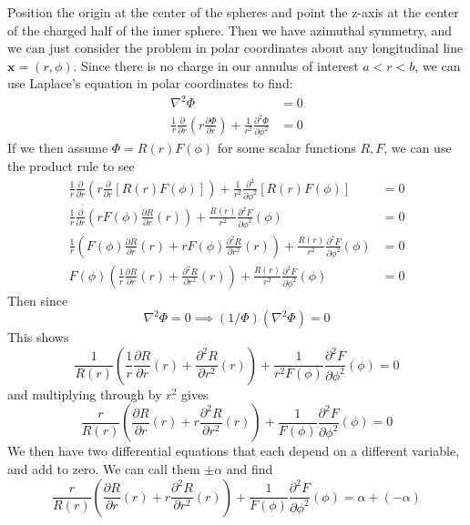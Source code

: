 \documentclass{article}
\begin{document}
\begin{solution}
Position the origin at the center of the spheres and point the z-axis at the center of the charged half of the inner sphere. Then we have azimuthal symmetry, and we can just consider the problem in polar coordinates about any longitudinal line $\mathbf{x} = (r,\phi)$. Since there is no charge in our annulus of interest $a < r < b$, we can use Laplace's equation in polar coordinates to find:
\begin{align*}
\nabla^{2} \Phi &= 0\\
\frac{1}{r} \frac{\partial}{\partial r} \left( r \frac{\partial \Phi}{\partial r} \right) + \frac{1}{r^{2}} \frac{\partial^{2} \Phi}{\partial \phi^{2}} &= 0
\end{align*}
If we then assume $\Phi=R(r)F(\phi)$ for some scalar functions $R,F$, we can use the product rule to see
\begin{align*}
\frac{1}{r} \frac{\partial}{\partial r} \left( r \frac{\partial}{\partial r} \left[ R(r)F(\phi) \right] \right) + \frac{1}{r^{2}} \frac{\partial^{2}}{\partial \phi^{2}} \left[ R(r)F(\phi) \right] &= 0\\
\frac{1}{r} \frac{\partial}{\partial r} \left( r F(\phi) \frac{\partial R}{\partial r}(r) \right) + \frac{R(r)}{r^{2}} \frac{\partial^{2} F}{\partial \phi^{2}}(\phi) &= 0\\
\frac{1}{r} \left( F(\phi) \frac{\partial R}{\partial r}(r) +  r F(\phi) \frac{\partial^{2} R}{\partial r^{2}}(r) \right) + \frac{R(r)}{r^{2}} \frac{\partial^{2} F}{\partial \phi^{2}}(\phi) &= 0\\
F(\phi) \left( \frac{1}{r} \frac{\partial R}{\partial r}(r) +  \frac{\partial^{2} R}{\partial r^{2}}(r) \right) + \frac{R(r)}{r^{2}} \frac{\partial^{2} F}{\partial \phi^{2}}(\phi) &= 0
\end{align*}
Then since 
\[ \nabla^{2}\Phi = 0 \implies (1/\Phi)(\nabla^{2}\Phi) = 0 \]
This shows
\[ \frac{1}{R(r)} \left( \frac{1}{r} \frac{\partial R}{\partial r}(r) +  \frac{\partial^{2} R}{\partial r^{2}}(r) \right) + \frac{1}{r^{2}F(\phi)} \frac{\partial^{2} F}{\partial \phi^{2}}(\phi) = 0 \]
and multiplying through by $r^{2}$ gives
\[ \frac{r}{R(r)} \left( \frac{\partial R}{\partial r}(r) + r \frac{\partial^{2} R}{\partial r^{2}}(r) \right) + \frac{1}{F(\phi)} \frac{\partial^{2} F}{\partial \phi^{2}}(\phi) = 0  \]
We then have two differential equations that each depend on a different variable, and add to zero. We can call them $\pm\alpha$ and find
\[ \frac{r}{R(r)} \left( \frac{\partial R}{\partial r}(r) + r \frac{\partial^{2} R}{\partial r^{2}}(r) \right) + \frac{1}{F(\phi)} \frac{\partial^{2} F}{\partial \phi^{2}}(\phi) = \alpha + (-\alpha) \]

\end{solution}
\end{document}
